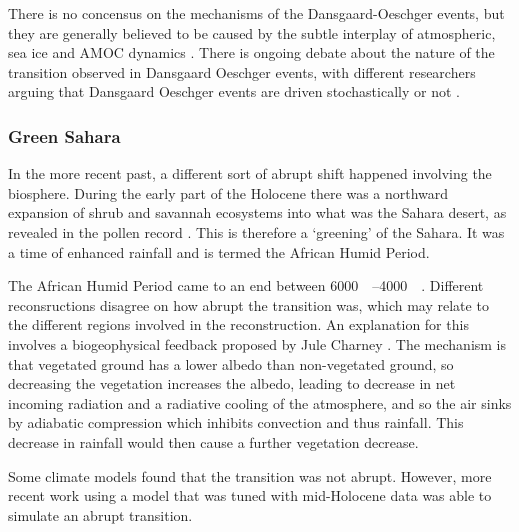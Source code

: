 There is no concensus on the mechanisms of the Dansgaard-Oeschger events, but they are generally believed to be caused by the subtle interplay of atmospheric, sea ice and AMOC dynamics
\parencite{Vettoretti2022,Boers2018,Riechers2023arxiv}. There is ongoing debate about the nature of the transition observed in Dansgaard Oeschger events, with different researchers arguing
that Dansgaard Oeschger events are driven stochastically \parencite{Ditlevsen2010,Ditlevsen1999} or not \parencite{Boers2018a}.

\subsubsection{Green Sahara}
In the more recent past, a different sort of abrupt shift happened involving the biosphere. During the early part of the Holocene there was a northward expansion of shrub and savannah ecosystems
into what was the Sahara desert, as revealed in the pollen record \parencite{Hoelzmann1998,Hely2014}. This is therefore a `greening' of the Sahara. It was a time of enhanced rainfall \parencite{Tierney2017}
and is termed the African Humid Period.

The African Humid Period came to an end between \SIrange{6000}{4000}{\year\beforepresent}. Different reconsructions \parencite{Shanahan2015,Kropelin2008} disagree on how abrupt the transition
was, which may relate to the different regions involved in the reconstruction. An explanation for this 
involves a biogeophysical feedback proposed by Jule Charney \parencite{Charney1975,Charney1975a}. The mechanism is that vegetated ground has a lower
albedo than non-vegetated ground, so decreasing the vegetation increases the albedo, leading to decrease in net incoming radiation and a radiative cooling of the atmosphere, and so the air sinks by adiabatic compression
which inhibits convection and thus rainfall. This decrease in rainfall would then cause a further vegetation decrease.

Some climate models \parencite{Renssen2006} found that the transition was not abrupt. However, more recent work \parencite{Hopcroft2021} using a model that was tuned with mid-Holocene data was able to simulate an abrupt
transition.

